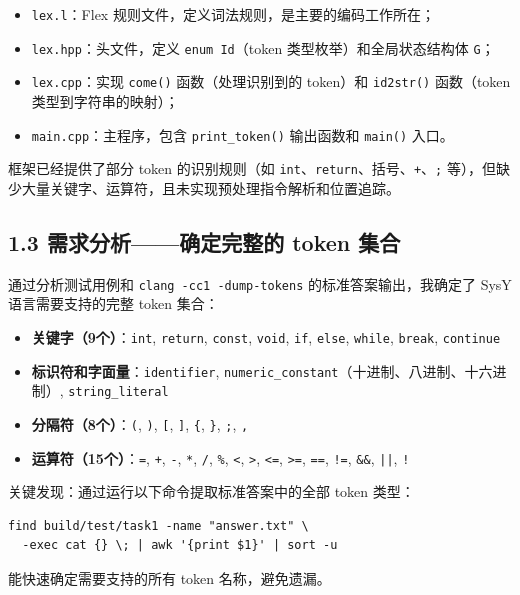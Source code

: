 \documentclass[12pt,a4paper]{article}
\begin{document}
\begin{itemize}[leftmargin=2em]
    \item \texttt{lex.l}：Flex 规则文件，定义词法规则，是主要的编码工作所在；
    \item \texttt{lex.hpp}：头文件，定义 \texttt{enum Id}（token 类型枚举）和全局状态结构体 \texttt{G}；
    \item \texttt{lex.cpp}：实现 \texttt{come()} 函数（处理识别到的 token）和 \texttt{id2str()} 函数（token 类型到字符串的映射）；
    \item \texttt{main.cpp}：主程序，包含 \texttt{print\_token()} 输出函数和 \texttt{main()} 入口。
\end{itemize}

框架已经提供了部分 token 的识别规则（如 \texttt{int}、\texttt{return}、括号、\texttt{+}、\texttt{;}
等），但缺少大量关键字、运算符，且未实现预处理指令解析和位置追踪。

\subsection{1.3 需求分析——确定完整的 token 集合}

通过分析测试用例和 \texttt{clang -cc1 -dump-tokens} 的标准答案输出，我确定了 SysY 语言需要支持的完整 token 集合：

\begin{itemize}[leftmargin=2em]
    \item \textbf{关键字（9个）}：\texttt{int}, \texttt{return}, \texttt{const}, \texttt{void}, \texttt{if}, \texttt{else}, \texttt{while}, \texttt{break}, \texttt{continue}
    \item \textbf{标识符和字面量}：\texttt{identifier}, \texttt{numeric\_constant}（十进制、八进制、十六进制）, \texttt{string\_literal}
    \item \textbf{分隔符（8个）}：\texttt{(}, \texttt{)}, \texttt{[}, \texttt{]}, \texttt{\{}, \texttt{\}}, \texttt{;}, \texttt{,}
    \item \textbf{运算符（15个）}：\texttt{=}, \texttt{+}, \texttt{-}, \texttt{*}, \texttt{/}, \texttt{\%}, \texttt{<}, \texttt{>}, \texttt{<=}, \texttt{>=}, \texttt{==}, \texttt{!=}, \texttt{\&\&}, \texttt{||}, \texttt{!}
\end{itemize}

关键发现：通过运行以下命令提取标准答案中的全部 token 类型：
\begin{lstlisting}[style=outputstyle]
find build/test/task1 -name "answer.txt" \
  -exec cat {} \; | awk '{print $1}' | sort -u
\end{lstlisting}
能快速确定需要支持的所有 token 名称，避免遗漏。
\end{document}
